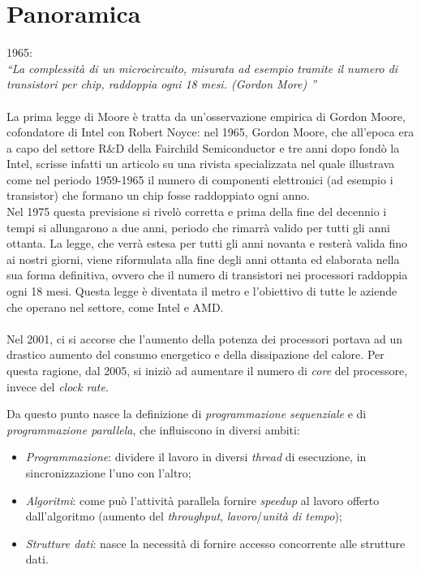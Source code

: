 \section{Panoramica}
1965: \\
\textit{\textquotedblleft La complessità di un microcircuito, misurata ad esempio tramite il numero di transistori per chip, raddoppia ogni 18 mesi. (\textit{Gordon More}) \textquotedblright}\\\\

La prima legge di Moore è tratta da un'osservazione empirica di Gordon Moore, cofondatore di Intel con Robert Noyce: nel 1965, Gordon Moore, che all'epoca era a capo del settore R\&D della Fairchild Semiconductor e tre anni dopo fondò la Intel, scrisse infatti un articolo su una rivista specializzata nel quale illustrava come nel periodo 1959-1965 il numero di componenti elettronici (ad esempio i transistor) che formano un chip fosse raddoppiato ogni anno. \\
Nel 1975 questa previsione si rivelò corretta e prima della fine del decennio i tempi si allungarono a due anni, periodo che rimarrà valido per tutti gli anni ottanta. La legge, che verrà estesa per tutti gli anni novanta e resterà valida fino ai nostri giorni, viene riformulata alla fine degli anni ottanta ed elaborata nella sua forma definitiva, ovvero che il numero di transistori nei processori raddoppia ogni 18 mesi. Questa legge è diventata il metro e l'obiettivo di tutte le aziende che operano nel settore, come Intel e AMD. \\\\

Nel 2001, ci si accorse che l'aumento della potenza dei processori portava ad un drastico aumento del consumo energetico e della dissipazione del calore.
Per questa ragione, dal 2005, si iniziò ad aumentare il numero di \textit{core} del processore, invece del \textit{clock rate}.

\newpage	

Da questo punto nasce la definizione di \textit{programmazione sequenziale} e di \textit{programmazione parallela}, che influiscono in diversi ambiti:
\begin{itemize}
	\item \textit{Programmazione}: dividere il lavoro in diversi \textit{thread} di esecuzione, in sincronizzazione l'uno con l'altro;
	\item \textit{Algoritmi}: come può l'attività parallela fornire \textit{speedup} al lavoro offerto dall'algoritmo (aumento del \textit{throughput}, \textit{lavoro}/\textit{unità di tempo});
	\item \textit{Strutture dati}: nasce la necessità di fornire accesso concorrente alle strutture dati.
\end{itemize}

